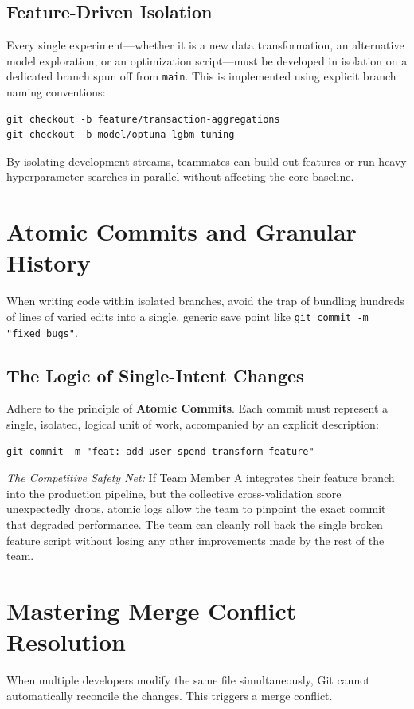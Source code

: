 \documentclass{article}
\begin{document}
\subsection{Feature-Driven Isolation}
Every single experiment—whether it is a new data transformation, an alternative model exploration, or an optimization script—must be developed in isolation on a dedicated branch spun off from \texttt{main}. This is implemented using explicit branch naming conventions:
\begin{verbatim}
git checkout -b feature/transaction-aggregations
git checkout -b model/optuna-lgbm-tuning
\end{verbatim}

By isolating development streams, teammates can build out features or run heavy hyperparameter searches in parallel without affecting the core baseline.

\section{Atomic Commits and Granular History}
When writing code within isolated branches, avoid the trap of bundling hundreds of lines of varied edits into a single, generic save point like \texttt{git commit -m "fixed bugs"}.

\subsection{The Logic of Single-Intent Changes}
Adhere to the principle of \textbf{Atomic Commits}. Each commit must represent a single, isolated, logical unit of work, accompanied by an explicit description:
\begin{verbatim}
git commit -m "feat: add user spend transform feature"
\end{verbatim}

\textit{The Competitive Safety Net:} If Team Member A integrates their feature branch into the production pipeline, but the collective cross-validation score unexpectedly drops, atomic logs allow the team to pinpoint the exact commit that degraded performance. The team can cleanly roll back the single broken feature script without losing any other improvements made by the rest of the team.

\section{Mastering Merge Conflict Resolution}
When multiple developers modify the same file simultaneously, Git cannot automatically reconcile the changes. This triggers a merge conflict.
\end{document}
